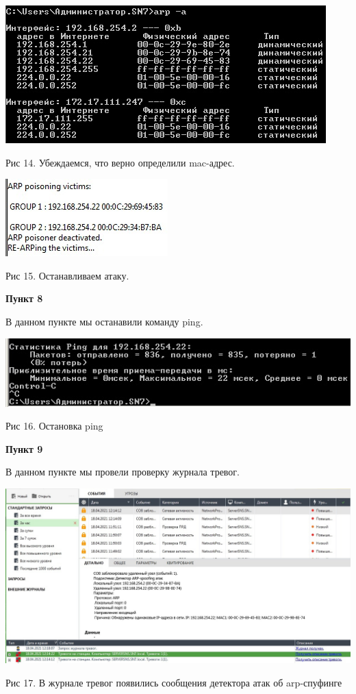 \documentclass[a4paper,14pt]{extarticle}
\begin{document}
\begin{center}
        \includegraphics[scale=0.8]{pics/7_4.jpg}

        Рис 14. Убеждаемся, что верно определили mac-адрес.

        \includegraphics[scale=0.9]{pics/7_5.jpg}

        Рис 15. Останавливаем атаку.
    \end{center}

    \textbf{Пункт 8}
    \vspace{-3ex}
    \begin{center}
        \singlespacing
        В данном пункте мы останавили команду ping.

        \includegraphics[scale=0.5]{pics/8.jpg}

        Рис 16. Остановка ping
    \end{center}

    \vspace{-2ex}
    \textbf{Пункт 9}
    \vspace{-3ex}
    \begin{center}
        \singlespacing
        В данном пункте мы провели проверку журнала тревог. 

        \includegraphics[scale=0.4]{pics/9.jpg}

        Рис 17. В журнале тревог появились сообщения детектора атак об arp-спуфинге
    \end{center}
\end{document}
